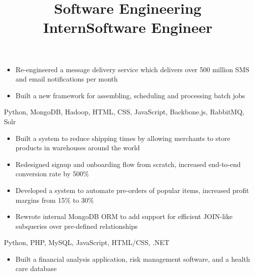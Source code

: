 \documentclass[]{res}
\begin{document}
\begin{resume}
\begin{position}
    \begin{itemize}
      \item Re-engineered a message delivery service which delivers over 500 million
        SMS and email notifications per month
      \item Built a new framework for assembling, scheduling and processing batch jobs
    \end{itemize}
  \end{position}
  \title{Software Engineering Intern}
  \begin{position}
    \begin{description}
      \item Python, MongoDB, Hadoop, HTML, CSS, JavaScript, Backbone.js, RabbitMQ, Solr
    \end{description}
    \begin{itemize}
      \item Built a system to reduce shipping times by allowing merchants to store products in warehouses
        around the world
      \item Redesigned signup and onboarding flow from scratch, increased end-to-end conversion rate by 500\%
      \item Developed a system to automate pre-orders of popular items, increased profit margins from 15\% to 30\%
      \item Rewrote internal MongoDB ORM to add support for efficient JOIN-like subqueries over pre-defined relationships
    \end{itemize}
  \end{position}
  \title{Software Engineer}
  \begin{position}
    \begin{description}
      \item Python, PHP, MySQL, JavaScript, HTML/CSS, .NET
    \end{description}
    \begin{itemize}
      \item Built a financial analysis application, risk management software, and a health care database
    \end{itemize}
  \end{position}


\end{resume}
\end{document}
